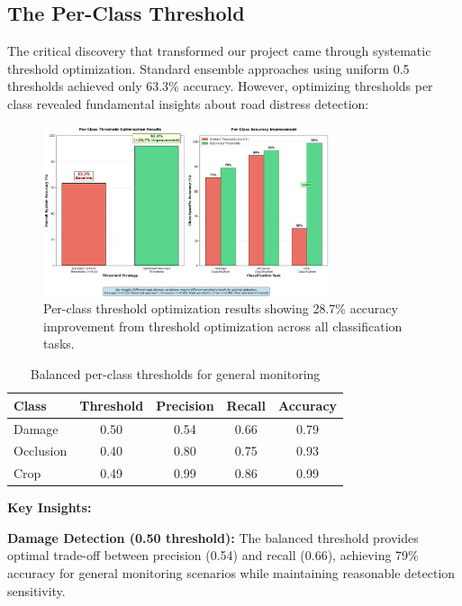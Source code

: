 \documentclass[12pt]{article}
\begin{document}
\subsection{The Per-Class Threshold}

The critical discovery that transformed our project came through systematic threshold optimization. Standard ensemble approaches using uniform 0.5 thresholds achieved only 63.3\% accuracy. However, optimizing thresholds per class revealed fundamental insights about road distress detection:

\begin{figure}[!htb]
\centering
\includegraphics[width=0.75\textwidth]{images/breakthrough_analysis.png}
\caption{Per-class threshold optimization results showing 28.7\% accuracy improvement from threshold optimization across all classification tasks.}
\end{figure}

\begin{table}[!h]
\centering
\begin{tabular}{lcccc}
\toprule
\textbf{Class} & \textbf{Threshold} & \textbf{Precision} & \textbf{Recall} & \textbf{Accuracy} \\
\midrule
Damage & 0.50 & 0.54 & 0.66 & 0.79 \\
Occlusion & 0.40 & 0.80 & 0.75 & 0.93 \\
Crop & 0.49 & 0.99 & 0.86 & 0.99 \\
\bottomrule
\end{tabular}
\caption{Balanced per-class thresholds for general monitoring}
\end{table}

\noindent\textbf{Key Insights:}

\textbf{Damage Detection (0.50 threshold):} The balanced threshold provides optimal trade-off between precision (0.54) and recall (0.66), achieving 79\% accuracy for general monitoring scenarios while maintaining reasonable detection sensitivity.
\end{document}
